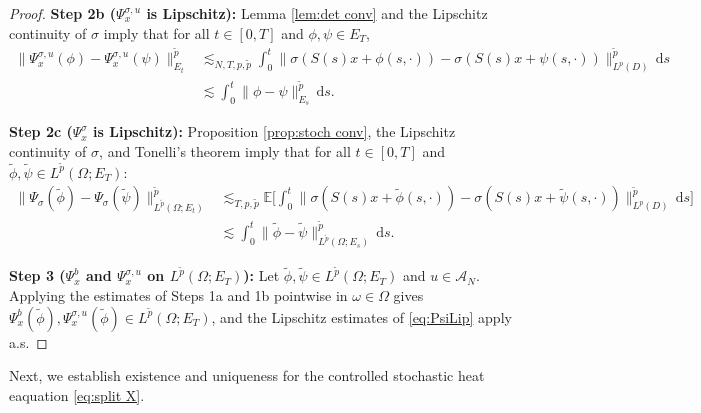 \documentclass[10pt,a4paper]{amsart}
\numberwithin{equation}{section}
\newcommand{\E}{{\mathbb E}}
\newcommand{\Om}{\Omega}
\newcommand{\om}{\omega}
\newcommand{\A}{{\mathcal A}}
\newcommand{\dd}{\,\mathrm{d}}
\begin{document}
\begin{proof}
\textbf{Step 2b ($\Psi_x^{\sigma,u}$ is Lipschitz):}
Lemma \ref{lem:det conv} and the Lipschitz continuity of $\sigma$ imply that for all $t\in[0,T]$ and $\phi,\psi\in E_T$, 
\begin{align*}
    \|\Psi_x^{\sigma,u}(\phi)-\Psi_x^{\sigma,u}(\psi)\|_{E_t}^{\tilde p} &\lesssim_{N,T,p,\tilde p} \int_0^t \|\sigma(S(s)x+\phi(s,\cdot))-\sigma(S(s)x+\psi(s,\cdot))\|_{L^p(D)}^{\tilde p}\dd s\\
    &\lesssim \int_0^t \| \phi  - \psi  \|_{E_s}^{\tilde p}\dd s.
\end{align*} 


\textbf{Step 2c ($\Psi_x^{\sigma}$ is Lipschitz):}
Proposition \ref{prop:stoch conv}, the Lipschitz continuity of $\sigma$, and Tonelli's theorem imply that for all $t\in[0,T]$ and $\tilde \phi, \tilde\psi\in L^{\tilde p}(\Om;E_T)$: 
\begin{align*}
    \|\Psi_{\sigma}(\tilde\phi)-\Psi_{\sigma}(\tilde\psi)\|_{L^{\tilde p}(\Om;E_t)}^{\tilde p} &\lesssim_{T,p,\tilde p} 
     \E\Big[\int_0^t \|\sigma(S(s)x+\tilde\phi(s,\cdot))-\sigma(S(s)x+\tilde\psi(s,\cdot))\|_{L^p(D)}^{\tilde p}\dd s\Big]\\
     &\lesssim 
    \int_0^t \|\tilde\phi  -\tilde\psi \|_{L^{\tilde p}(\Om;E_s)}^{\tilde p}\dd s. 
\end{align*} 

\textbf{Step 3 ($\Psi_x^b$ and $\Psi_x^{\sigma,u}$ on $L^{\tilde p}(\Om;E_T)$):} 
Let $\tilde \phi,\tilde\psi\in L^{\tilde p}(\Om;E_T)$ and $u\in\A_N$. Applying the estimates of Steps 1a and 1b pointwise in $\om\in\Om$ gives $\Psi_x^b(\tilde\phi),\Psi_x^{\sigma,u}(\tilde\phi)\in L^{\tilde p}(\Om;E_T)$, and the Lipschitz estimates of \eqref{eq:PsiLip} apply a.s. 
\end{proof}
 

Next, we establish  existence and uniqueness for the controlled stochastic heat eaquation \eqref{eq:split X}. 
\end{document}

